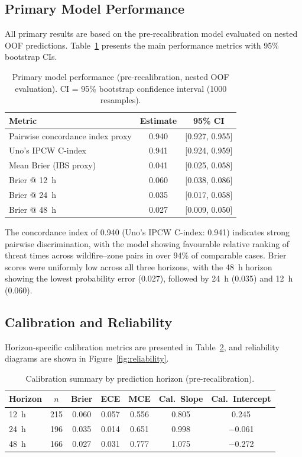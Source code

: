 \documentclass[fire,article,submit,pdftex]{../Definitions/mdpi}
\begin{document}
\subsection{Primary Model Performance}\label{sec:primary}

All primary results are based on the pre-recalibration model evaluated on nested OOF predictions.
Table~\ref{tab:primary} presents the main performance metrics with 95\% bootstrap CIs.

\begin{table}[!ht]
\caption{Primary model performance (pre-recalibration, nested OOF evaluation). CI = 95\% bootstrap confidence interval (1000 resamples).}\label{tab:primary}
\begin{tabular}{lcc}
\toprule
\textbf{Metric} & \textbf{Estimate} & \textbf{95\% CI} \\
\midrule
Pairwise concordance index proxy & 0.940 & [0.927, 0.955] \\
Uno's IPCW C-index               & 0.941 & [0.924, 0.959] \\
Mean Brier (IBS proxy)           & 0.041 & [0.025, 0.058] \\
Brier @ 12~h                     & 0.060 & [0.038, 0.086] \\
Brier @ 24~h                     & 0.035 & [0.017, 0.058] \\
Brier @ 48~h                     & 0.027 & [0.009, 0.050] \\
\bottomrule
\end{tabular}
\end{table}

The concordance index of 0.940 (Uno's IPCW C-index: 0.941) indicates strong pairwise discrimination, with the model showing favourable relative ranking of threat times across wildfire--zone pairs in over 94\% of comparable cases.
Brier scores were uniformly low across all three horizons, with the 48~h horizon showing the lowest probability error (0.027), followed by 24~h (0.035) and 12~h (0.060).

\subsection{Calibration and Reliability}\label{sec:calibration}

Horizon-specific calibration metrics are presented in Table~\ref{tab:calibration}, and reliability diagrams are shown in Figure~\ref{fig:reliability}.

\begin{table}[!ht]
\caption{Calibration summary by prediction horizon (pre-recalibration).}\label{tab:calibration}
\begin{tabular}{lcccccc}
\toprule
\textbf{Horizon} & $n$ & \textbf{Brier} & \textbf{ECE} & \textbf{MCE} & \textbf{Cal.\ Slope} & \textbf{Cal.\ Intercept} \\
\midrule
12~h & 215 & 0.060 & 0.057 & 0.556 & 0.805 & 0.245 \\
24~h & 196 & 0.035 & 0.014 & 0.651 & 0.998 & $-$0.061 \\
48~h & 166 & 0.027 & 0.031 & 0.777 & 1.075 & $-$0.272 \\
\bottomrule
\end{tabular}
\end{table}
\end{document}
